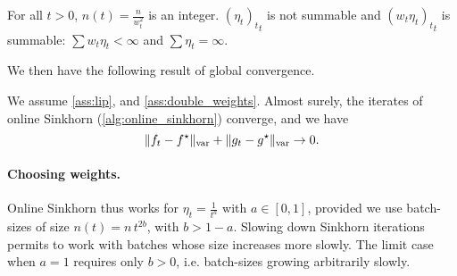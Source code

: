 \begin{assumption}\label{ass:double_weights}
    For all $t > 0$, $n(t) = \frac{n}{w_t^2}$ is an integer. ${(\eta_t)_t}_t$ is
    not summable and ${(w_t \eta_t)_t}_t$ is summable: $\sum w_t \eta_t <
    \infty$ and $\sum \eta_t = \infty$.
\end{assumption}
We then have the following result of global convergence.

\begin{proposition}\label{prop:convergence_true}
    We assume \autoref{ass:lip}, and
    \ref{ass:double_weights}. Almost surely, the iterates of online Sinkhorn
    (\autoref{alg:online_sinkhorn}) converge, and we have
    \begin{equation}
        \Vert f_t - f^\star \Vert_{\text{\upshape var}} + \Vert g_t - g^\star \Vert_{\text{\upshape var}} \to 0.
    \end{equation}
\end{proposition}

\paragraph{Choosing weights.}

Online Sinkhorn thus works for $\eta_t = \frac{1}{t^a}$ with $a \in [0, 1]$,
provided we use batch-sizes of size $n(t) = n\, t^{2b}$, with $b > 1 - a$.
Slowing down Sinkhorn iterations permits to work with batches whose size
increases more slowly. The limit case when $a = 1$ requires only $b > 0$, i.e.
batch-sizes growing arbitrarily slowly.